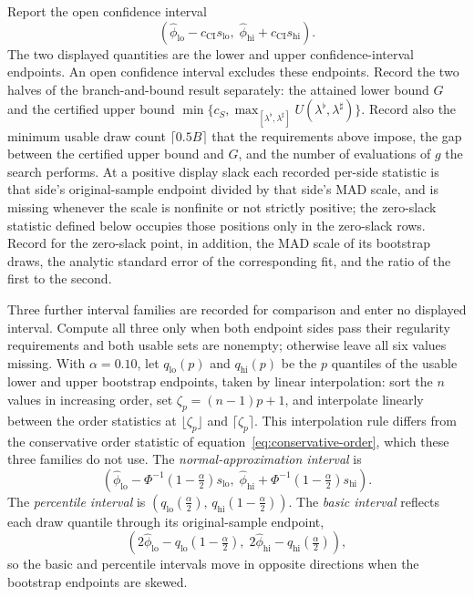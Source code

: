 \documentclass[11pt]{article}
\begin{document}
Report the open confidence
interval
\begin{equation*}
 (\widehat\phi_{\mathrm{lo}}-c_{\mathrm{CI}}s_{\mathrm{lo}},\;
 \widehat\phi_{\mathrm{hi}}+c_{\mathrm{CI}}s_{\mathrm{hi}}).
\end{equation*}
The two displayed quantities are the lower and upper confidence-interval endpoints. An open
confidence interval excludes these endpoints. Record the two halves of the branch-and-bound result
separately: the attained lower bound \(G\) and the certified upper bound
\(\min\{c_S,\max_{[\lambda^{\flat},\lambda^{\sharp}]}U(\lambda^{\flat},\lambda^{\sharp})\}\). Record also the minimum usable draw count
\(\lceil0.5B\rceil\) that the requirements above impose, the gap between the certified upper bound
and \(G\), and the number of evaluations of \(g\) the search performs. At a positive display slack
each recorded per-side statistic is that side's original-sample endpoint divided by that side's MAD
scale, and is missing whenever the scale is nonfinite or not strictly positive; the
zero-slack statistic defined below occupies those positions only in the zero-slack rows. Record for
the zero-slack point, in addition, the MAD scale of its bootstrap draws, the analytic standard error
of the corresponding fit, and the ratio of the first to the second.

Three further interval families are recorded for comparison and enter no displayed interval. Compute
all three only when both endpoint sides pass their regularity requirements and both usable sets are
nonempty; otherwise leave all six values missing. With \(\alpha=0.10\), let \(q_{\mathrm{lo}}(p)\)
and \(q_{\mathrm{hi}}(p)\) be the \(p\) quantiles of the usable lower and upper bootstrap
endpoints, taken by linear interpolation: sort the \(n\) values in increasing order, set
\(\zeta_p=(n-1)p+1\), and interpolate linearly between the order statistics at
\(\lfloor\zeta_p\rfloor\) and \(\lceil\zeta_p\rceil\). This interpolation rule differs from the
conservative order statistic of equation~\eqref{eq:conservative-order}, which these three families do
not use. The \emph{normal-approximation interval} is
\begin{equation*}
 \left(\widehat\phi_{\mathrm{lo}}-\Phi^{-1}(1-\tfrac{\alpha}{2})s_{\mathrm{lo}},\;
 \widehat\phi_{\mathrm{hi}}+\Phi^{-1}(1-\tfrac{\alpha}{2})s_{\mathrm{hi}}\right).
\end{equation*}
The \emph{percentile interval} is
\(\left(q_{\mathrm{lo}}(\tfrac{\alpha}{2}),\,q_{\mathrm{hi}}(1-\tfrac{\alpha}{2})\right)\).
The \emph{basic interval} reflects each draw quantile through its original-sample endpoint,
\begin{equation*}
 \left(2\widehat\phi_{\mathrm{lo}}-q_{\mathrm{lo}}(1-\tfrac{\alpha}{2}),\;
 2\widehat\phi_{\mathrm{hi}}-q_{\mathrm{hi}}(\tfrac{\alpha}{2})\right),
\end{equation*}
so the basic and percentile intervals move in opposite directions when the bootstrap endpoints are
skewed.
\end{document}
